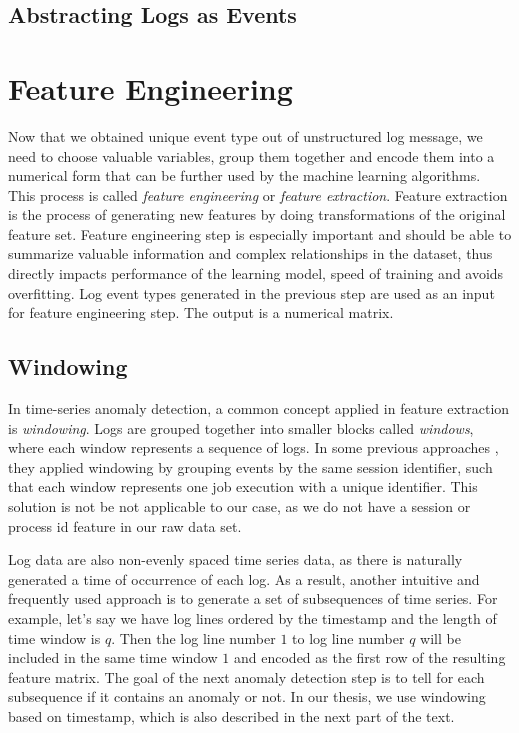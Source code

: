 \subsection{Abstracting Logs as Events}


\section{Feature Engineering}
\label{section:featureEngineering}
Now that we obtained unique event type out of unstructured log message, we need to choose valuable variables, group them together and encode them into a numerical form that can be further used by the machine learning algorithms.  This process is called \textit{feature engineering} or \textit{feature extraction}. Feature extraction is the process of generating new features by doing transformations of the original feature set.  
Feature engineering step is especially important and should be able to summarize valuable information and complex relationships in the dataset, thus directly impacts performance of the learning model, speed of training and avoids overfitting. Log event types generated in the previous step are used as an input for feature engineering step. The output is a numerical matrix. 

\subsection{Windowing}

In time-series anomaly detection, a common concept applied in feature extraction is \textit{windowing}. 
Logs are grouped together into smaller blocks called \textit{windows}, where each window represents a sequence of logs. In some previous approaches \cite{xu2009}, they applied windowing by grouping events by the same session identifier, such that each window represents one job execution with a unique identifier. This solution is not be not applicable to our case, as we do not have a session or process id feature in our raw data set.

Log data are also non-evenly spaced time series data, as there is naturally generated a time of occurrence of each log. As a result, another intuitive and frequently used approach is to generate a set of subsequences of time series. For example, let's say we have log lines ordered by the timestamp and the length of time window is $q$. Then the log line number $1$ to log line number $q$ will be included in the same time window $1$ and encoded as the first row of the resulting feature matrix. The goal of the next anomaly detection step is to tell for each subsequence if it contains an anomaly or not. In our thesis, we use windowing based on timestamp, which is also described in the next part of the text.    

